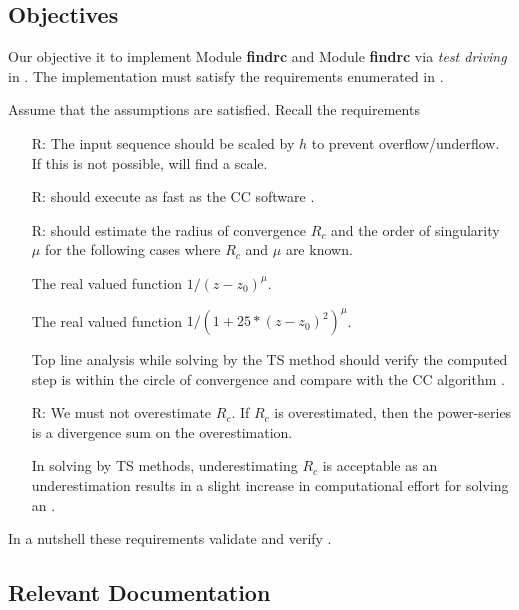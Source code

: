 \documentclass[12pt, titlepage]{article}
\newcounter{reqnum} %
\begin{document}
\subsection{Objectives}

Our objective it to implement Module {\bf findrc} and Module {\bf findrc} via
{\it test driving} in \cpp. The implementation must satisfy the requirements
enumerated in \cite{SRS}.

Assume that the assumptions are satisfied. Recall the requirements

\noindent \begin{itemize}

\item[R\refstepcounter{reqnum}\thereqnum \label{R_Inputs}:] The input
  sequence should be scaled by $h$ to prevent overflow/underflow.
  If this is not possible,  will find a scale.

\item[R\refstepcounter{reqnum}\thereqnum \label{R_Calculate}:]
   should execute as fast as the CC software \rdcon.

\item[R\refstepcounter{reqnum}\thereqnum \label{R_VerifyOutput}:]
   should estimate the radius of convergence $R_c$ and
    the order of singularity $\mu$ for the following cases where $R_c$ and $\mu$ are known.

  The real valued function $1/(z-z_0)^{\mu}$.

  The real valued function $1/(1 + 25*(z-z_0)^2)^{\mu}$.

  Top line analysis while solving \dae \ivp by the TS method should verify
    the computed step is within the circle of convergence and compare
    with the CC algorithm \rdcon.

\item[R\refstepcounter{reqnum}\thereqnum \label{R_Output}:] We must not overestimate $R_c$.
  If $R_c$ is overestimated, then the power-series is a divergence sum on the overestimation.

  In \ode solving by TS methods, underestimating $R_c$ is acceptable as an underestimation
  results in a slight increase in computational effort for solving an \ode \ivp.
\end{itemize}

In a nutshell these requirements validate and verify .

\subsection{Relevant Documentation}
\end{document}
